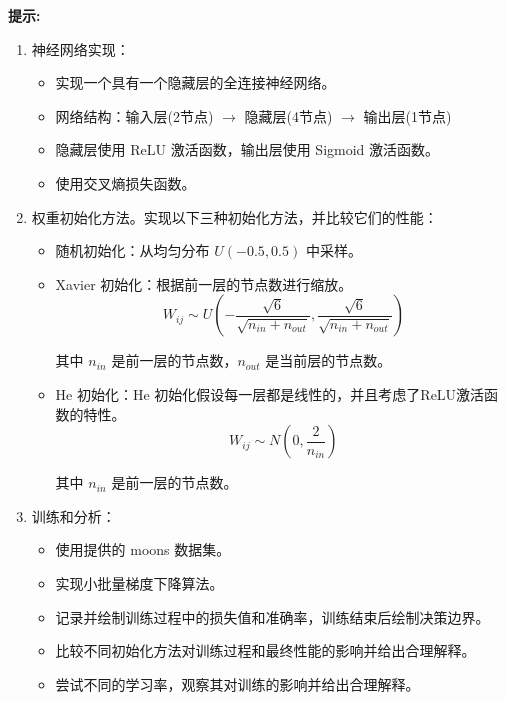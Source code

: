 \documentclass[8pt]{article}
\begin{document}
\textbf{提示:}

\begin{enumerate}
    \item 神经网络实现：
\begin{itemize}
    \item 实现一个具有一个隐藏层的全连接神经网络。
    \item 网络结构：输入层(2节点) $\rightarrow$ 隐藏层(4节点) $\rightarrow$ 输出层(1节点)
    \item 隐藏层使用 ReLU 激活函数，输出层使用 Sigmoid 激活函数。
    \item 使用交叉熵损失函数。
\end{itemize}
    \item 权重初始化方法。实现以下三种初始化方法，并比较它们的性能：
\begin{itemize}
    \item 随机初始化：从均匀分布 $U(-0.5, 0.5)$ 中采样。
    \item Xavier 初始化：根据前一层的节点数进行缩放。
    \[ W_{ij} \sim U\left( -\frac{\sqrt{6}}{\sqrt{n_{in} + n_{out}}}, \frac{\sqrt{6}}{\sqrt{n_{in} + n_{out}}} \right) \]

其中 \(n_{in}\) 是前一层的节点数，\(n_{out}\) 是当前层的节点数。
    \item He 初始化：He 初始化假设每一层都是线性的，并且考虑了ReLU激活函数的特性。\[ W_{ij} \sim N\left( 0, \frac{2}{n_{in}} \right) \]

其中 \(n_{in}\) 是前一层的节点数。
\end{itemize}
    \item 训练和分析：
\begin{itemize}
    \item 使用提供的 moons 数据集。
    \item 实现小批量梯度下降算法。
    \item 记录并绘制训练过程中的损失值和准确率，训练结束后绘制决策边界。
    \item 比较不同初始化方法对训练过程和最终性能的影响并给出合理解释。
    \item 尝试不同的学习率，观察其对训练的影响并给出合理解释。
\end{itemize}
\end{enumerate}
\end{document}
